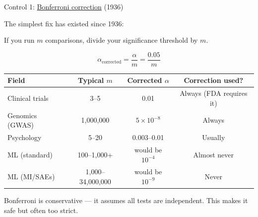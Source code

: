\documentclass[aspectratio=169,11pt]{beamer}
\begin{document}
\begin{frame}{Control 1: \href{https://en.wikipedia.org/wiki/Bonferroni_correction}{Bonferroni correction} (1936)}

The simplest fix has existed since 1936:

\vspace{0.5em}

\begin{center}
{\large If you run $m$ comparisons, divide your significance threshold by $m$.}

\vspace{0.5em}

$$\alpha_{\text{corrected}} = \frac{\alpha}{m} = \frac{0.05}{m}$$
\end{center}

\vspace{0.5em}

{\small
\begin{tabular}{lccc}
\toprule
\textbf{Field} & \textbf{Typical $m$} & \textbf{Corrected $\alpha$} & \textbf{Correction used?} \\
\midrule
Clinical trials & 3--5 & 0.01 & Always (FDA requires it) \\
Genomics (GWAS) & 1,000,000 & $5 \times 10^{-8}$ & Always \\
Psychology & 5--20 & 0.003--0.01 & Usually \\
ML (standard) & 100--1,000+ & would be $10^{-4}$ & Almost never \\
ML (MI/SAEs) & 1,000--34,000,000 & would be $10^{-9}$ & Never \\
\bottomrule
\end{tabular}
}

\vspace{0.5em}
{\small Bonferroni is conservative --- it assumes all tests are independent. This makes it safe but often too strict.}
\end{frame}
\end{document}
